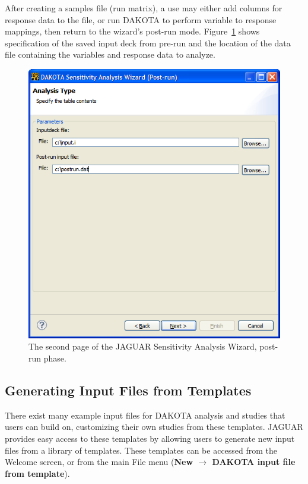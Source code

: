 After creating a samples file (run matrix), a use may either add
columns for response data to the file, or run DAKOTA to perform
variable to response mappings, then return to the wizard's post-run
mode.  Figure~\ref{fig:input:jaguar_sa_post_run} shows specification
of the saved input deck from pre-run and the location of the data file
containing the variables and response data to analyze.
\begin{figure}
  \centering
  \includegraphics[scale=0.5]{images/jaguar_sa_post_run}
  \caption{The second page of the JAGUAR Sensitivity Analysis Wizard,
  post-run phase.}
  \label{fig:input:jaguar_sa_post_run}
\end{figure}

\subsection{Generating Input Files from Templates}

There exist many example input files for DAKOTA analysis and studies
that users can build on, customizing their own studies from these
templates. JAGUAR provides easy access to these templates by allowing
users to generate new input files from a library of templates.  These
templates can be accessed from the Welcome screen, or from the main
File menu ({\bf New $\rightarrow$ DAKOTA input file from template}).

